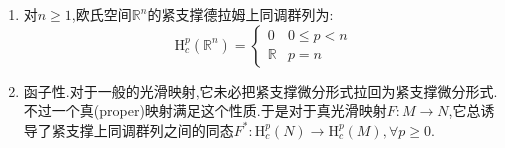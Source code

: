 \begin{enumerate}
\begin{proof}
		情况3,如果$p=n$.此时$\mathrm{H}^{n-1}_{\mathrm{dR}}(\mathbb{R}^n-\overline{B})\not=0$所以不能用情况2的方法.但是按照如下等式有$\eta_0$在$\partial B'$上的积分为零,我们之前证明过的一个定理说明这导致$\eta_0$在$\mathbb{R}^n-\overline{B}$上正合,剩下的操作就和情况2相同.
		$$0=\int_{\mathbb{R}^n}\omega=\int_{\overline{B'}}\omega=\int_{\overline{B'}}\mathrm{d}\eta_0=\int_{\partial B'}\eta_0$$
	\end{proof}
    \item 对$n\ge1$,欧氏空间$\mathbb{R}^n$的紧支撑德拉姆上同调群列为:
    $$\mathrm{H}_c^p(\mathbb{R}^n)=\left\{\begin{array}{cc}0&0\le p<n\\\mathbb{R}&p=n\end{array}\right.$$
    \item 函子性.对于一般的光滑映射,它未必把紧支撑微分形式拉回为紧支撑微分形式.不过一个真(proper)映射满足这个性质.于是对于真光滑映射$F:M\to N$,它总诱导了紧支撑上同调群列之间的同态$F^*:\mathrm{H}_c^p(N)\to\mathrm{H}_c^p(M),\forall p\ge0$.
\end{enumerate}

